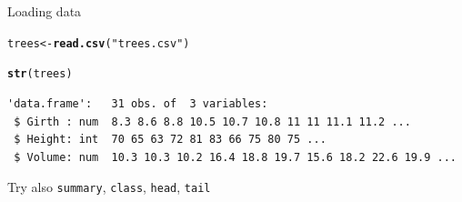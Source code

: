 \documentclass[10pt]{beamer}\usepackage[]{graphicx}\usepackage[]{color}
\makeatletter
\newcommand{\hlstr}[1]{\textcolor[rgb]{0.192,0.494,0.8}{#1}}%
\newcommand{\hlstd}[1]{\textcolor[rgb]{0.345,0.345,0.345}{#1}}%
\newcommand{\hlkwb}[1]{\textcolor[rgb]{0.69,0.353,0.396}{#1}}%
\newcommand{\hlkwd}[1]{\textcolor[rgb]{0.737,0.353,0.396}{\textbf{#1}}}%
\newenvironment{kframe}{%
 \def\at@end@of@kframe{}%
 \ifinner\ifhmode%
  \def\at@end@of@kframe{\end{minipage}}%
  \begin{minipage}{\columnwidth}%
 \fi\fi%
 \def\FrameCommand##1{\hskip\@totalleftmargin \hskip-\fboxsep
 \colorbox{shadecolor}{##1}\hskip-\fboxsep
     \hskip-\linewidth \hskip-\@totalleftmargin \hskip\columnwidth}%
 \MakeFramed {\advance\hsize-\width
   \@totalleftmargin\z@ \linewidth\hsize
   \@setminipage}}%
 {\par\unskip\endMakeFramed%
 \at@end@of@kframe}
\newenvironment{knitrout}{}{} %
\makeatother
\begin{document}
\begin{frame}[fragile]{Loading data}

\begin{knitrout}
\color{fgcolor}\begin{kframe}
\begin{alltt}
  \hlstd{trees} \hlkwb{<-} \hlkwd{read.csv}\hlstd{(}\hlstr{"trees.csv"}\hlstd{)}
\end{alltt}
\end{kframe}
\end{knitrout}
  \pause

\begin{knitrout}
\color{fgcolor}\begin{kframe}
\begin{alltt}
\hlkwd{str}\hlstd{(trees)}
\end{alltt}
\begin{verbatim}
'data.frame':	31 obs. of  3 variables:
 $ Girth : num  8.3 8.6 8.8 10.5 10.7 10.8 11 11 11.1 11.2 ...
 $ Height: int  70 65 63 72 81 83 66 75 80 75 ...
 $ Volume: num  10.3 10.3 10.2 16.4 18.8 19.7 15.6 18.2 22.6 19.9 ...
\end{verbatim}
\end{kframe}
\end{knitrout}

  Try also \texttt{summary}, \texttt{class}, \texttt{head}, \texttt{tail}
\end{frame}
\end{document}
